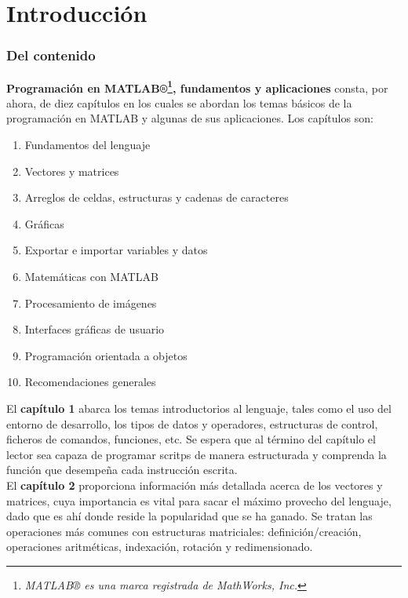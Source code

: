 \chapter*{Introducción}

\subsection*{Del contenido}

\textbf{Programación en MATLAB®\footnote{\emph{MATLAB® es una marca
  registrada de MathWorks, Inc.}}, fundamentos y aplicaciones} consta,
por ahora, de diez capítulos en los cuales se abordan los temas básicos
de la programación en MATLAB y algunas de sus aplicaciones. Los
capítulos son:

\begin{enumerate}
\item Fundamentos del lenguaje
\item Vectores y matrices
\item Arreglos de celdas, estructuras y cadenas de caracteres
\item Gráficas
\item Exportar e importar variables y datos
\item Matemáticas con MATLAB
\item Procesamiento de imágenes
\item Interfaces gráficas de usuario
\item Programación orientada a objetos
\item Recomendaciones generales
\end{enumerate}

El \textbf{capítulo 1} abarca los temas introductorios al lenguaje,
tales como el uso del entorno de desarrollo, los tipos de datos y
operadores, estructuras de control, ficheros de comandos, funciones, etc.
Se espera que al término del capítulo el lector sea capaza de programar 
scritps de manera estructurada y comprenda la función que desempeña 
cada instrucción escrita. \\

El \textbf{capítulo 2} proporciona información más detallada acerca de
los vectores y matrices, cuya importancia es vital para sacar el máximo
provecho del lenguaje, dado que es ahí donde reside la popularidad que
se ha ganado. Se tratan las operaciones más comunes con estructuras 
matriciales: definición/creación, operaciones aritméticas, indexación, 
rotación y redimensionado. \\

